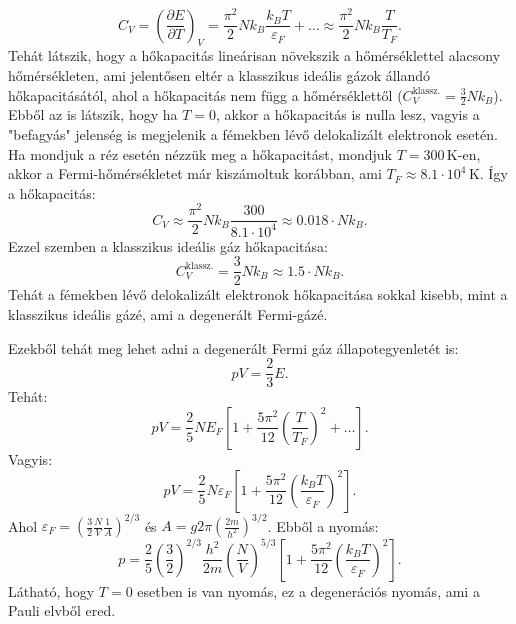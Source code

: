\documentclass[../main.tex]{subfiles}
\begin{document}
\begin{equation}
    C_V = \left( \frac{\partial E}{\partial T} \right)_V = \frac{\pi^2}{2} N k_B \frac{k_B T}{\varepsilon_F} + \ldots \approx \frac{\pi^2}{2} N k_B \frac{T}{T_F}.
\end{equation}
Tehát látszik, hogy a hőkapacitás lineárisan növekszik a hőmérséklettel alacsony hőmérsékleten, ami jelentősen eltér a klasszikus ideális gázok állandó hőkapacitásától, ahol a hőkapacitás nem függ a hőmérséklettől ($C_V^{\text{klassz.}} = \frac{3}{2} N k_B$).
Ebből az is látszik, hogy ha $T = 0$, akkor a hőkapacitás is nulla lesz, vagyis a "befagyás" jelenség is megjelenik a fémekben lévő delokalizált elektronok esetén. Ha mondjuk a réz esetén nézzük meg a hőkapacitást,
mondjuk $T = 300 \, \mathrm{K}$-en, akkor a Fermi-hőmérsékletet már kiszámoltuk korábban, ami $T_F \approx 8.1 \cdot 10^4 \, \mathrm{K}$. Így a hőkapacitás:
\begin{equation}
    C_V \approx \frac{\pi^2}{2} N k_B \frac{300}{8.1 \cdot 10^4} \approx 0.018 \cdot N k_B.
\end{equation}
Ezzel szemben a klasszikus ideális gáz hőkapacitása:
\begin{equation}
    C_V^{\text{klassz.}} = \frac{3}{2} N k_B \approx 1.5 \cdot N k_B.
\end{equation}
Tehát a fémekben lévő delokalizált elektronok hőkapacitása sokkal kisebb, mint a klasszikus ideális gázé, ami a degenerált Fermi-gázé.

Ezekből tehát meg lehet adni a degenerált Fermi gáz állapotegyenletét is:
\begin{equation}
    p V = \frac{2}{3} E.
\end{equation}
Tehát:
\begin{equation}
    p V = \frac{2}{5} N E_F \left[1 + \frac{5\pi^2}{12} \left( \frac{T}{T_F} \right)^2 + \ldots \right].
\end{equation}
Vagyis:
\begin{equation}
    \boxed{
        p V = \frac{2}{5} N \varepsilon_F \left[ 1 + \frac{5 \pi^2}{12} \left( \frac{k_B T}{\varepsilon_F} \right)^2 \right].
    }
\end{equation}
Ahol $\varepsilon_F = \left(\frac{3}{2} \frac{N}{V} \frac{1}{A}\right)^{2/3}$ és $A = g 2 \pi \left(\frac{2m}{h^2}\right)^{3/2}$.
Ebből a nyomás:
\begin{equation}
    p = \frac{2}{5} \left( \frac{3}{2} \right)^{2/3} \frac{h^2}{2m} \left( \frac{N}{V} \right)^{5/3} \left[ 1 + \frac{5 \pi^2}{12} \left( \frac{k_B T}{\varepsilon_F} \right)^2 \right].
\end{equation}
Látható, hogy $T = 0$ esetben is van nyomás, ez a degenerációs nyomás, ami a Pauli elvből ered.
\end{document}
